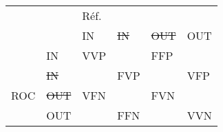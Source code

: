 \scriptsize{\begin{tabular}{|ll|llll|}
\hline
\multicolumn{2}{|l|}{}                                            & \multicolumn{4}{l|}{Réf.}                              \\ 
\cline{3-6} 
\multicolumn{2}{|l|}{\multirow{-2}{*}{}}                    & \multicolumn{1}{l|}{IN}
    & \multicolumn{1}{l|}{\sout{IN}}          
    & \multicolumn{1}{l|}{\sout{OUT}}   
    & \multicolumn{1}{l|}{OUT}      \\ 
\hline
\multicolumn{1}{|l|}{}                      
    & IN                         
    & \multicolumn{1}{l|}{VVP}
    & \multicolumn{1}{l|}{\cellcolor[HTML]{000000}} 
    & FFP   
    & \multicolumn{1}{l|}{\cellcolor[HTML]{000000}}\\ 
\cline{2-6} 
\multicolumn{1}{|l|}{}                      
    & \sout{IN}             
    & \multicolumn{1}{l|}{\cellcolor[HTML]{000000}}  
    & \multicolumn{1}{l|}{FVP}                      
    & \cellcolor[HTML]{000000} 
    & \multicolumn{1}{l|}{VFP}\\ 
\cline{2-6}
\multicolumn{1}{|l|}{\multirow{-4}{*}{ROC}} 
    & \sout{OUT}           
    & \multicolumn{1}{l|}{VFN} 
    & \multicolumn{1}{l|}{\cellcolor[HTML]{000000}} 
    & FVN  
    & \multicolumn{1}{l|}{\cellcolor[HTML]{000000}}                    \\ 
\cline{2-6} 
\multicolumn{1}{|l|}{}                      & {\color[HTML]{000000} OUT} 
    & \multicolumn{1}{l|}{\cellcolor[HTML]{000000}}
    & \multicolumn{1}{l|}{FFN} 
    & \cellcolor[HTML]{000000} 
    & \multicolumn{1}{l|}{VVN}\\
\hline
\end{tabular}}
